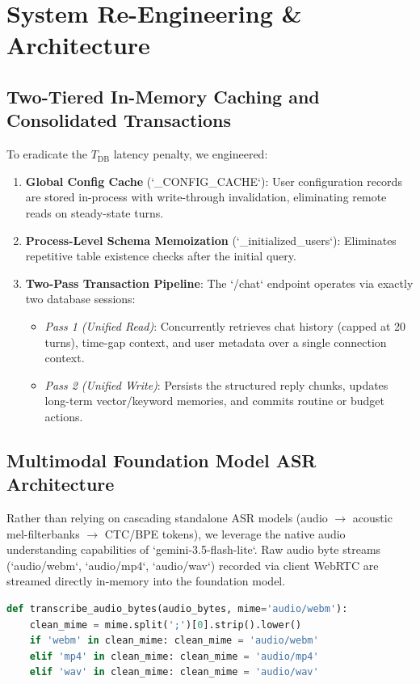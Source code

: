 \documentclass[conference]{IEEEtran}
\begin{document}
{\section{System Re-Engineering \& Architecture}

\subsection{Two-Tiered In-Memory Caching and Consolidated Transactions}
To eradicate the $T_{\text{DB}}$ latency penalty, we engineered:
\begin{enumerate}
    \item \textbf{Global Config Cache} (`_CONFIG_CACHE`): User configuration records are stored in-process with write-through invalidation, eliminating remote reads on steady-state turns.
    \item \textbf{Process-Level Schema Memoization} (`_initialized_users`): Eliminates repetitive table existence checks after the initial query.
    \item \textbf{Two-Pass Transaction Pipeline}: The `/chat` endpoint operates via exactly two database sessions:
    \begin{itemize}
        \item \textit{Pass 1 (Unified Read)}: Concurrently retrieves chat history (capped at 20 turns), time-gap context, and user metadata over a single connection context.
        \item \textit{Pass 2 (Unified Write)}: Persists the structured reply chunks, updates long-term vector/keyword memories, and commits routine or budget actions.
    \end{itemize}
\end{enumerate}

\subsection{Multimodal Foundation Model ASR Architecture}
Rather than relying on cascading standalone ASR models (audio $\rightarrow$ acoustic mel-filterbanks $\rightarrow$ CTC/BPE tokens), we leverage the native audio understanding capabilities of `gemini-3.5-flash-lite`. Raw audio byte streams (`audio/webm`, `audio/mp4`, `audio/wav`) recorded via client WebRTC are streamed directly in-memory into the foundation model.

\begin{lstlisting}[language=Python, caption={Multimodal Audio Speech-to-Text Implementation}]
def transcribe_audio_bytes(audio_bytes, mime='audio/webm'):
    clean_mime = mime.split(';')[0].strip().lower()
    if 'webm' in clean_mime: clean_mime = 'audio/webm'
    elif 'mp4' in clean_mime: clean_mime = 'audio/mp4'
    elif 'wav' in clean_mime: clean_mime = 'audio/wav'
    

\end{lstlisting}}
\end{document}
